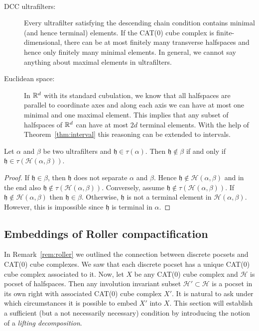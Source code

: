 \begin{bsp}\label{bsp:finite-terminal}~\vspace{-6pt}
  \begin{description}
  \item[DCC ultrafilters:] Every ultrafilter satisfying the descending chain condition contains minimal (and hence terminal) elements. If the CAT(0) cube complex is finite-dimensional, there can be at most finitely many transverse halfspaces and hence only finitely many minimal elements. In general, we cannot say anything about maximal elements in ultrafilters. 
  \item[Euclidean space:] In \(\mathbb{R}^d\) with its standard cubulation, we know that all halfspaces are parallel to coordinate axes and along each axis we can have at most one minimal and one maximal element. This implies that any subset of halfspaces of \(\mathbb{R}^d\) can have at most \(2d\) terminal elements. With the help of Theorem~\ref{thm:interval} this reasoning can be extended to intervals.
  \end{description}
\end{bsp}

\begin{lemma}[{\cite[Lemma~4.12]{MR3509968}}]
  \label{lem:4.12}
  Let \(\alpha\) and \(\beta\) be two ultrafilters and \(\mathfrak{h} \in \tau(\alpha)\). Then \(\mathfrak{h} \notin \beta\) if and only if \(\mathfrak{h} \in \tau(\mathcal{H}(\alpha,\beta))\).
\end{lemma}

\begin{proof}
  If \(\mathfrak{h} \in \beta\), then \(\mathfrak{h}\) does not separate \(\alpha\) and \(\beta\). Hence \(\mathfrak{h} \notin \mathcal{H}(\alpha, \beta)\) and in the end also \(\mathfrak{h} \notin \tau(\mathcal{H}(\alpha, \beta))\). Conversely, assume \(\mathfrak{h} \notin \tau(\mathcal{H}(\alpha, \beta))\). If \(\mathfrak{h} \notin \mathcal{H}(\alpha, \beta)\) then \(\mathfrak{h} \in \beta\). Otherwise, \(\mathfrak{h}\) is not a terminal element in \(\mathcal{H}(\alpha, \beta)\). However, this is impossible since \(\mathfrak{h}\) is terminal in \(\alpha\).
\end{proof}

\subsection{Embeddings of Roller compactification}
\label{sec:embedding-roller}
In Remark~\ref{rem:roller} we outlined the connection between discrete pocsets and CAT(0) cube complexes. We saw that each discrete pocset has a unique CAT(0) cube complex associated to it. Now, let \(X\) be any CAT(0) cube complex and \(\mathcal{H}\) is pocset of halfspaces. Then any involution invariant subset \(\mathcal{H}' \subset \mathcal{H}\) is a pocset in its own right with associated CAT(0) cube complex \(X'\). It is natural to ask under which circumstances it is possible to embed \(X'\) into \(X\). This section will establish a sufficient (but a not necessarily necessary) condition by introducing the notion of a \emph{lifting decomposition}.

